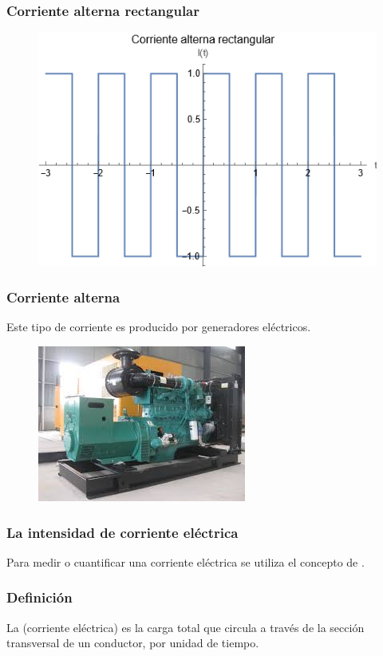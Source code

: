 \documentclass[14pt]{beamer}
\begin{document}
\begin{frame}
\frametitle{Corriente alterna rectangular}
\begin{figure}
    \centering
    \includegraphics[scale=0.7]{Imagenes/Corriente_05.png}
\end{figure}
\end{frame}
\begin{frame}
\frametitle{Corriente alterna}
Este tipo de corriente es producido por generadores eléctricos.
\begin{figure}
    \centering
    \includegraphics[scale=0.7]{Imagenes/Corriente_03.png}
\end{figure}
\end{frame}
\begin{frame}
\frametitle{La intensidad de corriente eléctrica}
Para medir o cuantificar una corriente eléctrica se utiliza el concepto de .
\end{frame}
\begin{frame}
\frametitle{Definición}
La  (corriente eléctrica) \pause es la carga total que circula a través de la sección transversal de un conductor, por unidad de tiempo.
\end{frame}
\end{document}
